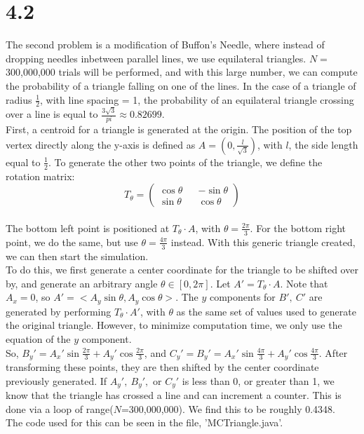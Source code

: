 \documentclass[12pt]{article}
\begin{document}
\section*{4.2}
The second problem is a modification of Buffon's Needle, where instead of dropping needles inbetween parallel lines, we use equilateral triangles. $N=$ 300,000,000 trials will be performed, and with this large number, we can compute the probability of a triangle falling on one of the lines. In the case of a triangle of radius $\frac{1}{2}$, with line spacing = 1, the probability of an equilateral triangle crossing over a line is equal to $\frac{3\sqrt{3}}{pi}\approx0.82699$. 
\\First, a centroid for a triangle is generated at the origin. The position of the top vertex directly along the y-axis is defined as $A = (0,\frac{l}{\sqrt{3}})$, with $l$, the side length equal to $\frac{1}{2}$. To generate the other two points of the triangle, we define the rotation matrix: $$T_{\theta}=\begin{pmatrix}
\cos\theta&&-\sin\theta\\\sin\theta&&\cos\theta
\end{pmatrix}$$
\\The bottom left point is positioned at $T_\theta\cdot A$, with $\theta = \frac{2\pi}{3}$. For the bottom right point, we do the same, but use $\theta = \frac{4\pi}{3}$ instead. With this generic triangle created, we can then start the simulation. 
\\To do this, we first generate a center coordinate for the triangle to be shifted over by, and generate an arbitrary angle $\theta\in[0,2\pi]$. Let $A' = T_\theta\cdot A$. Note that $A_x = 0$, so $A' = <A_y\sin\theta, A_y\cos\theta>$.
The $y$ components for $B',~C'$ are generated by performing $T_\theta\cdot A'$, with $\theta$ as the same set of  values used to generate the original triangle. However, to minimize computation time, we only use the equation of the $y$ component. 
\\So, $B_y' = A_x'\sin\frac{2\pi}{3} + A_y'\cos\frac{2\pi}{3}$, and $C_y' = B_y' = A_x'\sin\frac{4\pi}{3} + A_y'\cos\frac{4\pi}{3}$. After transforming these points, they are then shifted by the center coordinate previously generated.
If $A_y', ~B_y',$ or $C_y'$ is less than 0, or greater than 1, we know that the triangle has crossed a line and can increment a counter. This is done via a loop of range($N$=300,000,000). We find this to be roughly 0.4348.
\\The code used for this can be seen in the file, 'MCTriangle.java'.
\newpage
\end{document}
